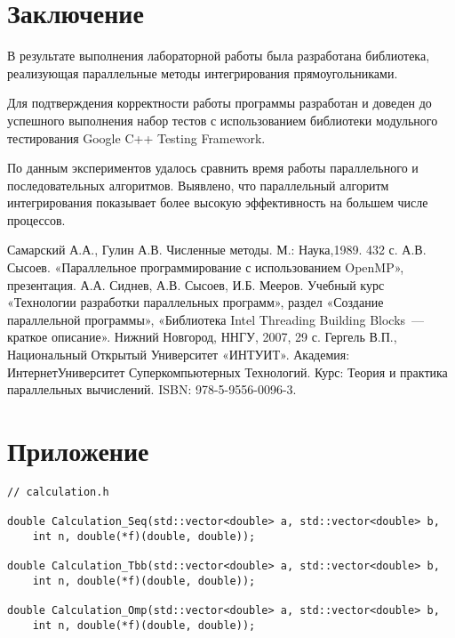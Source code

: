 \documentclass{report}
\begin{document}
\section*{Заключение}
В результате выполнения лабораторной работы была разработана библиотека, реализующая параллельные методы интегрирования прямоугольниками.
\par Для подтверждения корректности работы программы разработан и доведен до успешного выполнения набор тестов с использованием библиотеки модульного тестирования Google C++ Testing Framework.
\par По данным экспериментов удалось сравнить время работы параллельного и последовательных алгоритмов. Выявлено, что параллельный алгоритм интегрирования показывает более высокую эффективность на большем числе процессов.
\newpage

\begin{thebibliography}{1}
 Самарский А.А., Гулин А.В. Численные методы. М.: Наука,1989. 432 с.
 А.В. Сысоев. «Параллельное программирование с использованием OpenMP», презентация.
 А.А. Сиднев, А.В. Сысоев, И.Б. Мееров. Учебный курс «Технологии разработки параллельных программ», раздел «Создание параллельной программы», «Библиотека Intel Threading Building Blocks~--- краткое описание». Нижний Новгород, ННГУ, 2007, 29 с.
 Гергель В.П., Национальный Открытый Университет «ИНТУИТ». Академия: ИнтернетУниверситет Суперкомпьютерных Технологий. Курс: Теория и практика параллельных вычислений. ISBN: 978-5-9556-0096-3.
\end{thebibliography}
\newpage

\section*{Приложение}
\begin{lstlisting}
// calculation.h

double Calculation_Seq(std::vector<double> a, std::vector<double> b,
    int n, double(*f)(double, double));
    
double Calculation_Tbb(std::vector<double> a, std::vector<double> b,
    int n, double(*f)(double, double));
    
double Calculation_Omp(std::vector<double> a, std::vector<double> b,
    int n, double(*f)(double, double));
\end{lstlisting}
\end{document}
